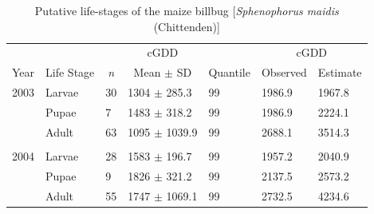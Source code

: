 \documentclass[agronomy,article,submit,moreauthors,pdftex,10pt,a4paper]{mdpi}
\theoremstyle{mdpi}
\newcounter{ex}
\newcounter{re}
\theoremstyle{mdpidefinition}
\begin{document}
\begin{table}
 \begin{threeparttable}
\caption{Putative life-stages of the maize billbug [\textit{Sphenophorus maidis} (Chittenden)]}
\label{table2}
\begin{tabular}{lllllll} 
\toprule
~                        &                                &                                  & \multicolumn{1}{c}{cGDD\tnote{$\ddagger$}}     &                              & \multicolumn{2}{c}{cGDD\tnote{$\dagger$}}                                    \\ 
\cmidrule{4-4}\cmidrule{6-6}\cmidrule{7-7}
\multicolumn{1}{c}{Year} & \multicolumn{1}{c}{Life Stage} & \multicolumn{1}{c}{ \textit{n} } & \multicolumn{1}{c}{Mean $\pm$ SD} & \multicolumn{1}{c}{Quantile} & \multicolumn{1}{c}{Observed} & \multicolumn{1}{c}{Estimate}  \\ 
\bottomrule
2003                     & Larvae                         & 30                               & 1304 $\pm$ 285.3                   & 99                           & 1986.9                       & 1967.8                        \\
                         & Pupae                          & 7                                & 1483 $\pm$ 318.2                   & 99                           & 1986.9                       & 2224.1                        \\
                         & Adult                          & 63                               & 1095 $\pm$ 1039.9                  & 99                           & 2688.1                       & 3514.3                        \\
                         &                                &                                  &                              &                              &                              &                               \\
2004                     & Larvae                         & 28                               & 1583 $\pm$ 196.7                   & 99                           & 1957.2                       & 2040.9                        \\
                         & Pupae                          & 9                                & 1826 $\pm$ 321.2                   & 99                           & 2137.5                       & 2573.2                        \\
                         & Adult                          & 55                               & 1747 $\pm$ 1069.1                  & 99                           & 2732.5                       & 4234.6                        \\
\bottomrule
\end{tabular}
\begin{tablenotes}
			\small
            

\end{tablenotes}
\end{threeparttable}
\end{table}
\end{document}
